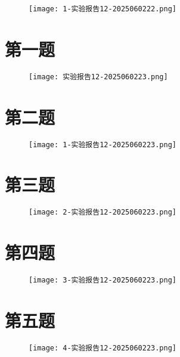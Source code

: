 \begin{figure}[H]
\centering
\texttt{[image: 1-实验报告12-2025060222.png]}
\label{}
\end{figure}

\section{第一题}

\begin{figure}[H]
\centering
\texttt{[image: 实验报告12-2025060223.png]}
\label{}
\end{figure}

\section{第二题}

\begin{figure}[H]
\centering
\texttt{[image: 1-实验报告12-2025060223.png]}
\label{}
\end{figure}

\section{第三题}

\begin{figure}[H]
\centering
\texttt{[image: 2-实验报告12-2025060223.png]}
\label{}
\end{figure}

\section{第四题}

\begin{figure}[H]
\centering
\texttt{[image: 3-实验报告12-2025060223.png]}
\label{}
\end{figure}

\section{第五题}

\begin{figure}[H]
\centering
\texttt{[image: 4-实验报告12-2025060223.png]}
\label{}
\end{figure}
